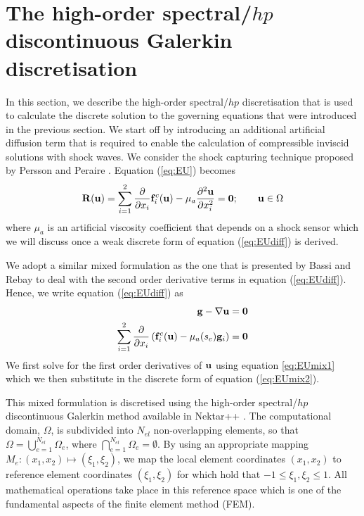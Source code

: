 \documentclass[review]{elsarticle}
\begin{document}
\section{The high-order spectral/$hp$ discontinuous Galerkin discretisation} 
In this section, we describe the high-order spectral/$hp$ discretisation that is used to calculate the discrete solution to the governing equations that were introduced in the previous section. 
We start off by introducing an additional artificial diffusion term that is required to enable the calculation of compressible inviscid solutions with shock waves. We consider the shock capturing technique proposed by Persson and Peraire \cite{Persson2006}. Equation (\ref{eq:EU}) becomes
\begin{equation}\label{eq:EUdiff}
{\bf R}({\bf u}) = \sum_{i=1}^2\frac{\partial }{\partial x_i}{\bf f}_i^c({\bf u})-\mu_a\frac{\partial^2 {\bf u}}{\partial x_i^2}={\bf 0}; \qquad {{\bf u}}\in \Omega
\end{equation}
where $\mu_a$ is an artificial viscosity coefficient that depends on a shock sensor which we will discuss once a weak discrete form of equation (\ref{eq:EUdiff}) is derived.
\par We adopt a similar mixed formulation as the one that is presented by Bassi and Rebay \cite{Bassi1996} to deal with the second order derivative terms in equation (\ref{eq:EUdiff}). Hence, we write equation (\ref{eq:EUdiff}) as
\begin{eqnarray}\label{eq:EUmixed}
{\bf g} - \nabla {\bf u}&= \bf {\bf 0}\label{eq:EUmix1}\\
\sum_{i=1}^{2}\frac{\partial }{\partial x_i}\left({\bf f}^c_i({\bf u})-\mu_a(s_e){\bf g}_i\right) &= {\bf 0}\label{eq:EUmix2}
\end{eqnarray}
We first solve for the first order derivatives of $\bf u$ using equation \ref{eq:EUmix1} which we then substitute in the discrete form of equation (\ref{eq:EUmix2}).
\par This mixed formulation is discretised using the high-order spectral/{$hp$} discontinuous Galerkin method available in Nektar++ \cite{Cantwell2015}. 
The computational domain, $\Omega$, is subdivided into $N_{el}$ non-overlapping elements, so that
$\Omega = \bigcup_{e=1}^{N_{el}}\Omega_e$, where $\bigcap_{e=1}^{N_{el}}\Omega_e=\emptyset$.  
By using an appropriate mapping $M_e:(x_1,x_2)\mapsto(\xi_1,\xi_2)$, we map the local element coordinates $(x_1, x_2)$ to reference element coordinates $(\xi_1,\xi_2)$ for which hold that $-1\leq \xi_1,\xi_2\leq 1$. All mathematical operations take place in this reference space which is one of the fundamental aspects of the finite element method (FEM).
\end{document}
